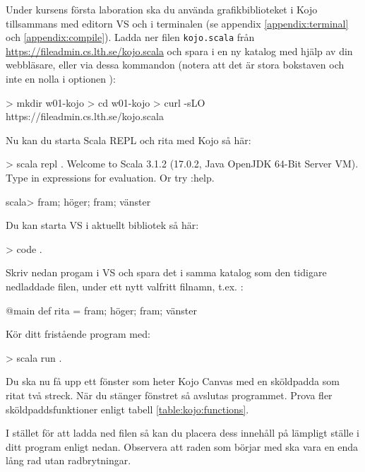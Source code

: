 Under kursens första laboration ska du använda grafikbiblioteket i Kojo tillsammans med editorn VS  och  i terminalen (se appendix \ref{appendix:terminal} och \ref{appendix:compile}). Ladda ner filen \texttt{kojo.scala} från \url{https://fileadmin.cs.lth.se/kojo.scala} och spara i en ny katalog med hjälp av din webbläsare, eller via dessa kommandon (notera att det är stora bokstaven  och inte en nolla i optionen ):

\begin{REPLnonum}
> mkdir w01-kojo
> cd w01-kojo
> curl -sLO https://fileadmin.cs.lth.se/kojo.scala
\end{REPLnonum}

Nu kan du starta Scala REPL och rita med Kojo så här:

\begin{REPLnonum}
> scala repl .
Welcome to Scala 3.1.2 (17.0.2, Java OpenJDK 64-Bit Server VM).
Type in expressions for evaluation. Or try :help.

scala> fram; höger; fram; vänster

\end{REPLnonum}

Du kan starta VS  i aktuellt bibliotek så här:
\begin{REPLnonum}
> code .
\end{REPLnonum}

Skriv nedan progam i VS  och spara det i samma katalog som den tidigare nedladdade filen, under ett nytt valfritt filnamn, t.ex. :

\begin{Code}
@main def rita = { fram; höger; fram; vänster }
\end{Code}

Kör ditt fristående program med:
\begin{REPLnonum}
> scala run .
\end{REPLnonum}

Du ska nu få upp ett fönster som heter Kojo Canvas med en sköldpadda som ritat två streck. När du stänger fönstret så avslutas programmet. Prova fler sköldpaddsfunktioner enligt tabell \ref{table:kojo:functions}.

I stället för att ladda ned filen  så kan du placera dess innehåll på lämpligt ställe i ditt program enligt nedan. Observera att raden som börjar med  ska vara en enda lång rad utan radbrytningar.%



